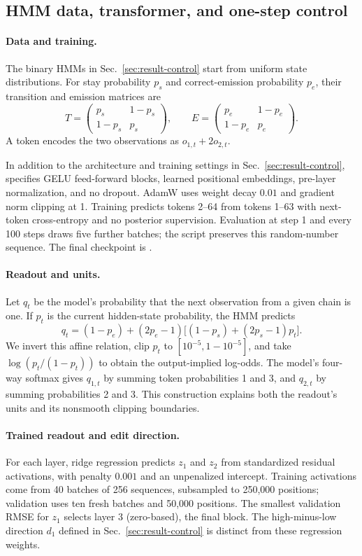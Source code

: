 \subsection{HMM data, transformer, and one-step control}\label{app:hmm-control-setup}

\paragraph{Data and training.}
The binary HMMs in Sec.~\ref{sec:result-control} start from uniform state distributions. For stay probability $p_s$ and correct-emission probability $p_e$, their transition and emission matrices are
\[
T=\begin{pmatrix}p_s&1-p_s\\1-p_s&p_s\end{pmatrix},\qquad
E=\begin{pmatrix}p_e&1-p_e\\1-p_e&p_e\end{pmatrix}.
\]
A token encodes the two observations as $o_{1,t}+2o_{2,t}$.

In addition to the architecture and training settings in Sec.~\ref{sec:result-control},  specifies GELU feed-forward blocks, learned positional embeddings, pre-layer normalization, and no dropout. AdamW uses weight decay $0.01$ and gradient norm clipping at 1. Training predicts tokens 2--64 from tokens 1--63 with next-token cross-entropy and no posterior supervision. Evaluation at step 1 and every 100 steps draws five further batches; the script preserves this random-number sequence. The final checkpoint is .

\paragraph{Readout and units.}
Let $q_t$ be the model's probability that the next observation from a given chain is one. If $p_t$ is the current hidden-state probability, the HMM predicts
\[
q_t=(1-p_e)+(2p_e-1)\big[(1-p_s)+(2p_s-1)p_t\big].
\]
We invert this affine relation, clip $p_t$ to $[10^{-5},1-10^{-5}]$, and take $\log(p_t/(1-p_t))$ to obtain the output-implied log-odds. The model's four-way softmax gives $q_{1,t}$ by summing token probabilities 1 and 3, and $q_{2,t}$ by summing probabilities 2 and 3. This construction explains both the readout's units and its nonsmooth clipping boundaries.

\paragraph{Trained readout and edit direction.}
For each layer, ridge regression predicts $z_1$ and $z_2$ from standardized residual activations, with penalty $0.001$ and an unpenalized intercept. Training activations come from 40 batches of 256 sequences, subsampled to 250,000 positions; validation uses ten fresh batches and 50,000 positions. The smallest validation RMSE for $z_1$ selects layer 3 (zero-based), the final block. The high-minus-low direction $d_1$ defined in Sec.~\ref{sec:result-control} is distinct from these regression weights.

